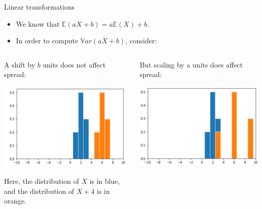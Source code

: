 \documentclass[aspectratio=169]{../latex_main/tntbeamer}  %
\begin{document}
	
	\begin{frame}[c]{Linear transformations}
	    
	    \begin{itemize}
	        \item We know that  $\mathbb{E}(aX + b) = a\mathbb{E}(X) + b$.
	        \item In order to compute $\mathbb{V}ar(aX + b)$, consider:\\
	    \end{itemize}
	    
	    \begin{columns}
	    
	        \begin{column}{.5\textwidth}
	        
	                A shift by $b$ units does not affect spread:

                        \centering
	                    \includegraphics[scale=.5]{Bild7}
	                    
	                Here, the distribution of $X$ is in blue, and the distribution of $X+4$ is in orange.
	        \end{column}
	        
	        
	        \begin{column}{.5\textwidth}
	        
	                But scaling by a units does affect spread:
                        
                        \centering
	                    \includegraphics[scale=.35]{Bild8}


\end{column}
\end{columns}
\end{frame}
\end{document}
